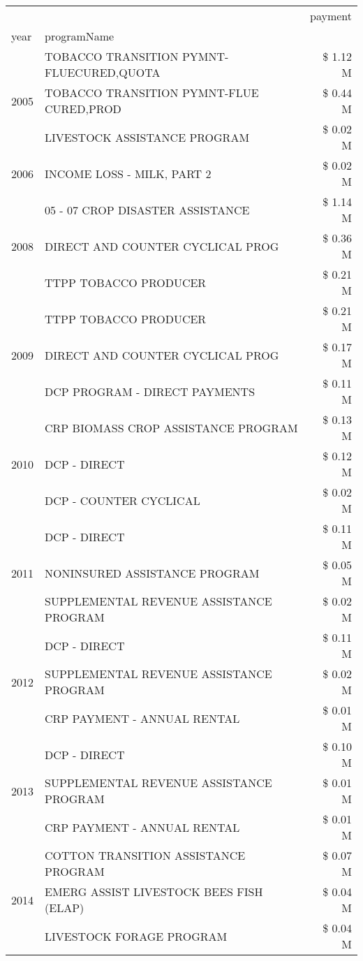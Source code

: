 \begin{tabular}{llr}
\toprule
 &  & payment \\
year & programName &  \\
\midrule
\multirow[t]{3}{*}{2005} & TOBACCO TRANSITION PYMNT-FLUECURED,QUOTA & \$ 1.12 M \\
 & TOBACCO TRANSITION PYMNT-FLUE CURED,PROD & \$ 0.44 M \\
 & LIVESTOCK ASSISTANCE PROGRAM & \$ 0.02 M \\
\cline{1-3}
2006 & INCOME LOSS - MILK, PART 2 & \$ 0.02 M \\
\cline{1-3}
\multirow[t]{3}{*}{2008} & 05 - 07 CROP DISASTER ASSISTANCE & \$ 1.14 M \\
 & DIRECT AND COUNTER CYCLICAL PROG & \$ 0.36 M \\
 & TTPP TOBACCO PRODUCER & \$ 0.21 M \\
\cline{1-3}
\multirow[t]{3}{*}{2009} & TTPP TOBACCO PRODUCER & \$ 0.21 M \\
 & DIRECT AND COUNTER CYCLICAL PROG & \$ 0.17 M \\
 & DCP PROGRAM - DIRECT PAYMENTS & \$ 0.11 M \\
\cline{1-3}
\multirow[t]{3}{*}{2010} & CRP BIOMASS CROP ASSISTANCE PROGRAM & \$ 0.13 M \\
 & DCP - DIRECT & \$ 0.12 M \\
 & DCP - COUNTER CYCLICAL & \$ 0.02 M \\
\cline{1-3}
\multirow[t]{3}{*}{2011} & DCP - DIRECT & \$ 0.11 M \\
 & NONINSURED ASSISTANCE PROGRAM & \$ 0.05 M \\
 & SUPPLEMENTAL REVENUE ASSISTANCE PROGRAM & \$ 0.02 M \\
\cline{1-3}
\multirow[t]{3}{*}{2012} & DCP - DIRECT & \$ 0.11 M \\
 & SUPPLEMENTAL REVENUE ASSISTANCE PROGRAM & \$ 0.02 M \\
 & CRP PAYMENT - ANNUAL RENTAL & \$ 0.01 M \\
\cline{1-3}
\multirow[t]{3}{*}{2013} & DCP - DIRECT & \$ 0.10 M \\
 & SUPPLEMENTAL REVENUE ASSISTANCE PROGRAM & \$ 0.01 M \\
 & CRP PAYMENT - ANNUAL RENTAL & \$ 0.01 M \\
\cline{1-3}
\multirow[t]{3}{*}{2014} & COTTON TRANSITION ASSISTANCE PROGRAM & \$ 0.07 M \\
 & EMERG ASSIST LIVESTOCK BEES FISH (ELAP) & \$ 0.04 M \\
 & LIVESTOCK FORAGE PROGRAM & \$ 0.04 M \\

\end{tabular}
